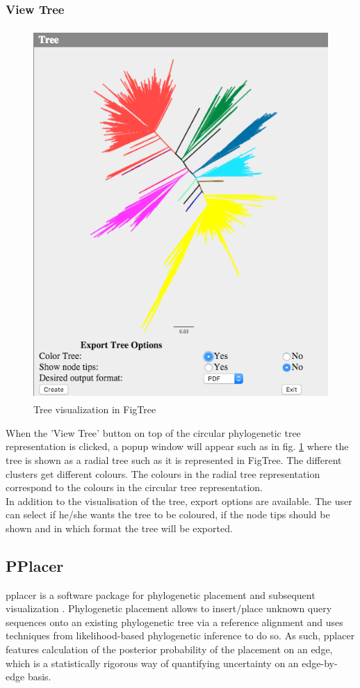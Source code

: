 \documentclass[a4paper, 11pt]{article} %
\begin{document}
\subsubsection{View Tree}
\begin{figure}[H]
\centering
\includegraphics[width=400pt, height=400pt, keepaspectratio=true]{images/view_tree.PNG}
\caption{Tree visualization in FigTree}
\label{fig:view_tree}
\end{figure}
When the 'View Tree' button on top of the circular phylogenetic tree representation is clicked, a popup window will appear such as in fig. \ref{fig:view_tree} where the tree is shown as a radial tree such as it is represented in FigTree. The different clusters get different colours. The colours in the radial tree representation correspond to the colours in the circular tree representation.
\\
In addition to the visualisation of the tree, export options are available. The user can select if he/she wants the tree to be coloured, if the node tips should be shown and in which format the tree will be exported. 

\subsection{PPlacer}
pplacer is a software package for phylogenetic placement and subsequent visualization \citep{Matsen2010}.
Phylogenetic placement allows to insert/place unknown query sequences onto an existing phylogenetic tree via a reference alignment and uses techniques from likelihood-based phylogenetic inference to do so.
As such, pplacer features calculation of the posterior probability of the placement on an edge, which is a statistically rigorous way of quantifying uncertainty on an edge-by-edge basis.
\end{document}
